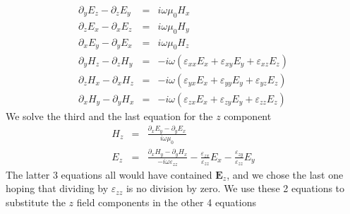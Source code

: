 \documentclass[12pt,a4paper,twoside,openright,BCOR10mm,headsepline,titlepage,abstracton,chapterprefix,final]{scrreprt}
\newcommand\Vector[1]{{\mathbf{#1}}}
\newcommand\vacuum{0}
\newcommand\scalarEfield{E}
\newcommand\scalarHfield{H}
\newcommand\Efield{\Vector{\scalarEfield}}
\newcommand\vacuumpermeability{\scalarpermeability_{\vacuum}}
\newcommand\scalarpermeability{\mu}
\newcommand\scalarpermittivity{\varepsilon}
\begin{document}
\begin{subequations}
  \begin{eqnarray}
    \partial_y \scalarEfield_z - \partial_z \scalarEfield_y &=& i \omega \vacuumpermeability \scalarHfield_x
    \\
    \partial_z \scalarEfield_x - \partial_x \scalarEfield_z &=& i \omega \vacuumpermeability \scalarHfield_y
    \\
    \partial_x \scalarEfield_y - \partial_y \scalarEfield_x &=& i \omega \vacuumpermeability \scalarHfield_z
    \\
    \partial_y \scalarHfield_z - \partial_z \scalarHfield_y &=& -i \omega
      \left( 
        \scalarpermittivity_{xx} \scalarEfield_x + 
        \scalarpermittivity_{xy} \scalarEfield_y +
        \scalarpermittivity_{xz} \scalarEfield_z
      \right)
    \\
    \partial_z \scalarHfield_x - \partial_x \scalarHfield_z &=& -i \omega 
      \left( 
        \scalarpermittivity_{yx} \scalarEfield_x + 
        \scalarpermittivity_{yy} \scalarEfield_y +
        \scalarpermittivity_{yz} \scalarEfield_z
      \right)
    \\
    \partial_x \scalarHfield_y - \partial_y \scalarHfield_x &=& -i \omega  
      \left( 
        \scalarpermittivity_{zx} \scalarEfield_x + 
        \scalarpermittivity_{zy} \scalarEfield_y +
        \scalarpermittivity_{zz} \scalarEfield_z
      \right)
  \end{eqnarray}
\end{subequations}
We solve the third and the last equation for the $z$ component
\begin{eqnarray}
   \scalarHfield_z &=&   
     \frac{ \partial_x \scalarEfield_y - \partial_y \scalarEfield_x }
          { i \omega \vacuumpermeability } 
     \\
     \scalarEfield_z
     &=&
     \frac{ \partial_x \scalarHfield_y - \partial_y \scalarHfield_x}
          { -i \omega \scalarpermittivity_{zz} }
     - \frac{\scalarpermittivity_{zx}}{\scalarpermittivity_{zz}} \scalarEfield_x
     - \frac{\scalarpermittivity_{zy}}{\scalarpermittivity_{zz}} \scalarEfield_y
\end{eqnarray}
The latter 3 equations all would have contained $\Efield_z$,
and we chose the last one hoping that dividing by $\scalarpermittivity_{zz}$ is no division by zero. We use these 2 equations to substitute the $z$ field components in the other 4 equations
\end{document}
